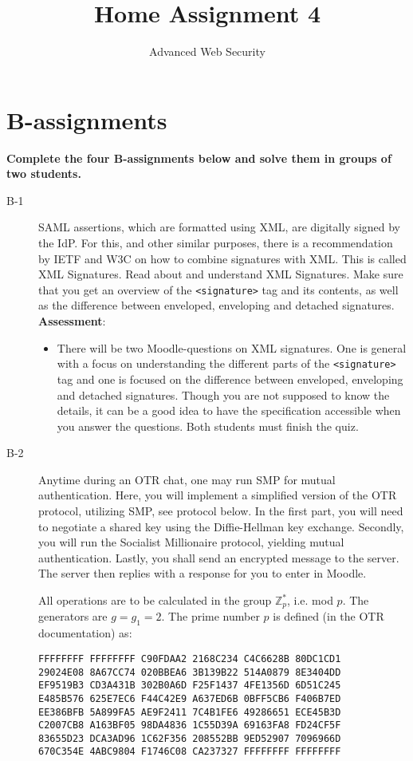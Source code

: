 \documentclass{article}
\begin{document}
\title{Home Assignment 4}
\author{Advanced Web Security}
\date{\the\year}

\maketitle

\section*{B-assignments}
\textbf{Complete the four B-assignments below and solve them in groups of two students.}

\begin{description}

	\item[B-1]{SAML assertions, which are formatted using XML, are digitally signed by the IdP. For this, and other similar purposes, there is a recommendation by IETF and W3C on how to combine signatures with XML. This is called XML Signatures. Read about and understand XML Signatures. Make sure that you get an overview of the \texttt{<signature>} tag and its contents, as well as the difference between enveloped, enveloping and detached signatures.\\
    \textbf{Assessment}:
	\begin{itemize}
		\item There will be two Moodle-questions on XML signatures. One is general with a focus on understanding the different parts of the \texttt{<signature>} tag and one is focused on the difference between enveloped, enveloping and detached signatures. Though you are not supposed to know the details, it can be a good idea to have the specification accessible when you answer the questions. Both students must finish the quiz.
	\end{itemize}}

	\item[B-2]{Anytime during an OTR chat, one may run SMP for mutual authentication. Here, you will implement
    a simplified version of the OTR protocol, utilizing SMP, see protocol below. In the first part,
    you will need to negotiate a shared key using the Diffie-Hellman key exchange.
    Secondly, you will run the Socialist Millionaire protocol, yielding mutual authentication.
    Lastly, you shall send an encrypted message to the server. The server then replies with a response for you to enter in Moodle.
    
    All operations are to be calculated in the group $\mathbb{Z}_p^*$, i.e. mod $p$. The generators are $g = g_1 = 2$.
    The prime number $p$ is defined (in the OTR documentation) as:
    \begin{verbatim}
FFFFFFFF FFFFFFFF C90FDAA2 2168C234 C4C6628B 80DC1CD1
29024E08 8A67CC74 020BBEA6 3B139B22 514A0879 8E3404DD
EF9519B3 CD3A431B 302B0A6D F25F1437 4FE1356D 6D51C245
E485B576 625E7EC6 F44C42E9 A637ED6B 0BFF5CB6 F406B7ED
EE386BFB 5A899FA5 AE9F2411 7C4B1FE6 49286651 ECE45B3D
C2007CB8 A163BF05 98DA4836 1C55D39A 69163FA8 FD24CF5F
83655D23 DCA3AD96 1C62F356 208552BB 9ED52907 7096966D
670C354E 4ABC9804 F1746C08 CA237327 FFFFFFFF FFFFFFFF
    \end{verbatim}
    
}
\end{description}
\end{document}
